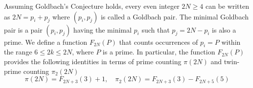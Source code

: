 Assuming Goldbach's Conjecture holds, every even integer $2N \geq 4 $ can be written as $2N = p_i + p_j$
where $(p_i, p_j)$ is called a Goldbach pair.
The minimal Goldbach pair is a pair $(p_i,p_j)$ having the minimal $p_i$ such that $p_j = 2N - p_i$ is also a prime.
We define a function $F_{2N}(P)$ that counts occurrences of $p_i = P$ within the range $6 \leq 2k \leq 2N$,
where $P$ is a prime.
In particular, the function $F_{2N}(P)$ provides the following identities in terms of prime counting $\pi(2N)$ and
twin-prime counting $\pi_2(2N)$
\[
    \pi(2N) = F_{2N+3}(3) + 1, \quad \pi_2(2N) = F_{2N+3}(3) - F_{2N+5}(5)
\]

